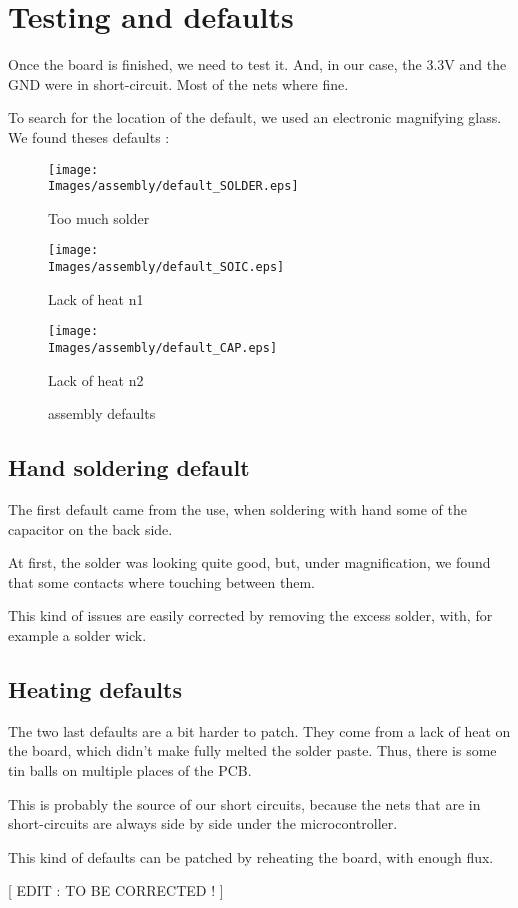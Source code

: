 \section{Testing and defaults}
Once the board is finished, we need to test it. And, in our case, the $3.3 \si{\volt}$
and the GND were in short-circuit. Most of the nets where fine.

To search for the location of the default, we used an electronic magnifying glass.
We found theses defaults :

\begin{figure}[!hbt]
    \centering
    \begin{minipage}[c]{0.32\textwidth}
        \centering
        \texttt{[image: \\Images/assembly/default\_SOLDER.eps]}
        \caption*{Too much solder}
    \end{minipage}%
    \hfill%
    \begin{minipage}[c]{0.32\textwidth}
        \centering
        \texttt{[image: \\Images/assembly/default\_SOIC.eps]}
        \caption*{Lack of heat n1}
    \end{minipage}%
    \hfill%
    \begin{minipage}[c]{0.32\textwidth}
        \centering
        \texttt{[image: \\Images/assembly/default\_CAP.eps]}
        \caption*{Lack of heat n2}
    \end{minipage}%
    \label{img:defaults}
    \caption{assembly defaults}
\end{figure}
\FloatBarrier

\subsection{Hand soldering default}
The first default came from the use, when soldering with hand some of the
capacitor on the back side.

At first, the solder was looking quite good, but, under magnification, we
found that some contacts where touching between them.

This kind of issues are easily corrected by removing the excess solder,
with, for example a solder wick.

\subsection{Heating defaults}
The two last defaults are a bit harder to patch. They come from a lack
of heat on the board, which didn't make fully melted the solder paste.
Thus, there is some tin balls on multiple places of the PCB.

This is probably the source of our short circuits, because the nets that
are in short-circuits are always side by side under the microcontroller.

This kind of defaults can be patched by reheating the board, with enough
flux.

    [ EDIT : TO BE CORRECTED ! ]
